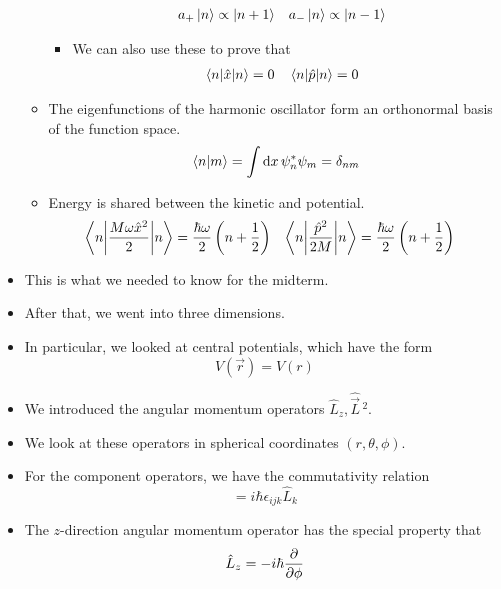 \documentclass[../notes.tex]{subfiles}
\begin{document}
\begin{itemize}
\begin{itemize}
\begin{itemize}
\begin{align*}
                a_+\ket{n} &\propto \ket{n+1}&
                a_-\ket{n} &\propto \ket{n-1}
            \end{align*}
            \item We can also use these to prove that
            \begin{align*}
                \ev{\hat{x}}{n} &= 0&
                \ev{\hat{p}}{n} &= 0
            \end{align*}
        \end{itemize}
        \item The eigenfunctions of the harmonic oscillator form an orthonormal basis of the function space.
        \begin{equation*}
            \braket{n}{m} = \int\dd{x}\psi_n^*\psi_m
            = \delta_{nm}
        \end{equation*}
        \item Energy is shared between the kinetic and potential.
        \begin{align*}
            \ev**{\frac{M\omega\hat{x}^2}{2}}{n} &= \frac{\hbar\omega}{2}\left( n+\frac{1}{2} \right)&
            \ev**{\frac{\hat{p}^2}{2M}}{n} &= \frac{\hbar\omega}{2}\left( n+\frac{1}{2} \right)
        \end{align*}
    \end{itemize}
    \item This is what we needed to know for the midterm.
    \item After that, we went into three dimensions.
    \item In particular, we looked at central potentials, which have the form
    \begin{equation*}
        V(\vec{r}) = V(r)
    \end{equation*}
    \item We introduced the angular momentum operators $\hat{L}_z,\hat{\vec{L}}{\,}^2$.
    \item We look at these operators in spherical coordinates $(r,\theta,\phi)$.
    \item For the component operators, we have the commutativity relation
    \begin{equation*}
        [\hat{L}_i,\hat{L}_j] = i\hbar\epsilon_{ijk}\hat{L}_k
    \end{equation*}
    \item The $z$-direction angular momentum operator has the special property that
    \begin{equation*}
        \hat{L}_z = -i\hbar\pdv{\phi}
    \end{equation*}

\end{itemize}
\end{document}
